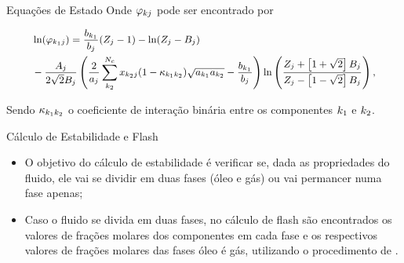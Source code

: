 \documentclass[professionalfont]{beamer}
\begin{document}
\begin{frame}{Equações de Estado}
    Onde $\varphi_{k j}$ pode ser encontrado por

    \begin{equation}
        \small
        \label{eq:eos.10}
        \begin{aligned}
            &\ln (\varphi_{k_{1} j}) = \dfrac{b_{k_{1}}}{b_{j}} (Z_{j} - 1) - \ln (Z_{j} - B_{j})\\
            &- \dfrac{A_{j}}{2\sqrt{2} B_{j}} \left(\dfrac{2}{a_{j}} \sum_{k_{2}}^{N_{c}} x_{k_{2} j}(1 - \kappa_{k_{1} k_{2}})\sqrt{a_{k_{1}} a_{k_{2}}} - \dfrac{b_{k_{1}}}{b_{j}} \right) \ln \left(\dfrac{Z_{j} + \left[1 + \sqrt{2} \right] B_{j}}{Z_{j} - \left[1 - \sqrt{2} \right] B_{j}} \right),
        \end{aligned}
    \end{equation}

    Sendo $\kappa_{k_{1} k_{2}}$ o coeficiente de interação binária entre os componentes $k_{1}$ e $k_{2}$.

\end{frame}

\begin{frame}{Cálculo de Estabilidade e Flash}

    \begin{itemize}
        \item O objetivo do cálculo de estabilidade é verificar se, dada as propriedades do fluido, ele vai se dividir em duas fases (óleo e gás) ou vai permancer numa fase apenas;
        \item Caso o fluido se divida em duas fases, no cálculo de flash são encontrados os valores de frações molares dos componentes em cada fase e os respectivos valores de frações molares das fases óleo é gás, utilizando o procedimento de .
    \end{itemize} 
    
\end{frame}
\end{document}
